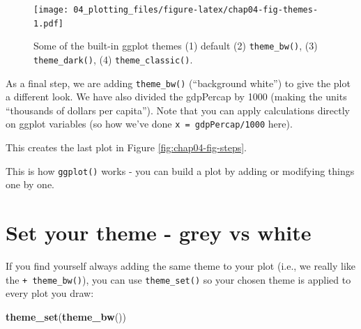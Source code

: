 \documentclass[
  12pt,
  krantz2]{krantz}
\makeatletter
\newenvironment{Shaded}{\begin{snugshade}}{\end{snugshade}}
\newcommand{\DataTypeTok}[1]{\textcolor[rgb]{0.13,0.29,0.53}{#1}}
\newcommand{\DecValTok}[1]{\textcolor[rgb]{0.00,0.00,0.81}{#1}}
\newcommand{\KeywordTok}[1]{\textcolor[rgb]{0.13,0.29,0.53}{\textbf{#1}}}
\newcommand{\NormalTok}[1]{#1}
\newcommand{\OperatorTok}[1]{\textcolor[rgb]{0.81,0.36,0.00}{\textbf{#1}}}
\newcommand{\StringTok}[1]{\textcolor[rgb]{0.31,0.60,0.02}{#1}}
\newenvironment{kframe}{%
\medskip{}
\setlength{\fboxsep}{.8em}
 \def\at@end@of@kframe{}%
 \ifinner\ifhmode%
  \def\at@end@of@kframe{\end{minipage}}%
  \begin{minipage}{\columnwidth}%
 \fi\fi%
 \def\FrameCommand##1{\hskip\@totalleftmargin \hskip-\fboxsep
 \colorbox{shadecolor}{##1}\hskip-\fboxsep
     \hskip-\linewidth \hskip-\@totalleftmargin \hskip\columnwidth}%
 \MakeFramed {\advance\hsize-\width
   \@totalleftmargin\z@ \linewidth\hsize
   \@setminipage}}%
 {\par\unskip\endMakeFramed%
 \at@end@of@kframe}
\renewenvironment{Shaded}{\begin{kframe}}{\end{kframe}}
\makeatother
\begin{document}
\begin{figure}
\centering
\texttt{[image: 04\_plotting\_files/figure-latex/chap04-fig-themes-1.pdf]}
\caption{\label{fig:chap04-fig-themes}Some of the built-in ggplot themes (1) default (2) \texttt{theme\_bw()}, (3) \texttt{theme\_dark()}, (4) \texttt{theme\_classic()}.}
\end{figure}

As a final step, we are adding \texttt{theme\_bw()} (``background white'') to give the plot a different look.
We have also divided the gdpPercap by 1000 (making the units ``thousands of dollars per capita'').
Note that you can apply calculations directly on ggplot variables (so how we've done \texttt{x\ =\ gdpPercap/1000} here).

\begin{Shaded}
\end{Shaded}

This creates the last plot in Figure \ref{fig:chap04-fig-steps}.

This is how \texttt{ggplot()} works - you can build a plot by adding or modifying things one by one.

\hypertarget{set-your-theme---grey-vs-white}{%
\section{Set your theme - grey vs white}\label{set-your-theme---grey-vs-white}}

If you find yourself always adding the same theme to your plot (i.e., we really like the \texttt{+\ theme\_bw()}), you can use \texttt{theme\_set()} so your chosen theme is applied to every plot you draw:

\begin{Shaded}
\begin{Highlighting}[]
\KeywordTok{theme_set}\NormalTok{(}\KeywordTok{theme_bw}\NormalTok{())}
\end{Highlighting}
\end{Shaded}
\end{document}
